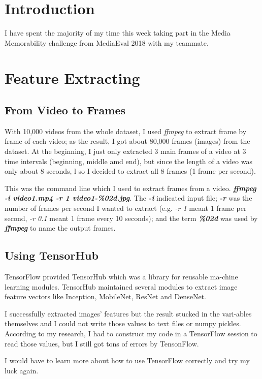 \section{Introduction}
I have spent the majority of my time this week taking part in the Media Memorability challenge from MediaEval 2018 with my teammate.

\section{Feature Extracting}
\subsection{From Video to Frames}
With 10,000 videos from the whole dataset, I used \emph{ffmpeg} to extract frame by frame of each video; as the result, I got about 80,000 frames (images) from the dataset. At the beginning, I just only extracted 3 main frames of a video at 3 time intervals (beginning, middle amd end),  but since the length of a video was only about 8 seconds, l so I decided to extract all 8 frames (1 frame per second).

This was the command line which I used to extract frames from a video. \textbf{\emph{ffmpeg -i video1.mp4 -r 1 video1-\%02d.jpg}}. The \textbf{\emph{-i}} indicated input file; \textbf{\emph{-r}} was the number of frames per second I wanted to extract (e.g. \emph{-r 1} meant 1 frame per second,  \emph{-r 0.1} meant 1 frame every 10 seconds); and the term \textbf{\emph{\%02d}} was used by \textbf{\emph{ffmpeg}} to name the output frames.

\subsection{Using TensorHub}
TensorFlow\cite{tensorflow} provided TensorHub which was a library for reusable ma-chine learning modules. TensorHub maintained several modules to extract image feature vectors like Inception, MobileNet, ResNet and DenseNet.

I successfully extracted images' features but the result stucked in the vari-ables themselves and I could not write those values to text files or numpy pickles. According to my research, I had to construct my code in a TensorFlow session to read those values, but I still got tons of errors by TensonFlow.

I would have to learn more about how to use TensorFlow correctly and try my luck again.

